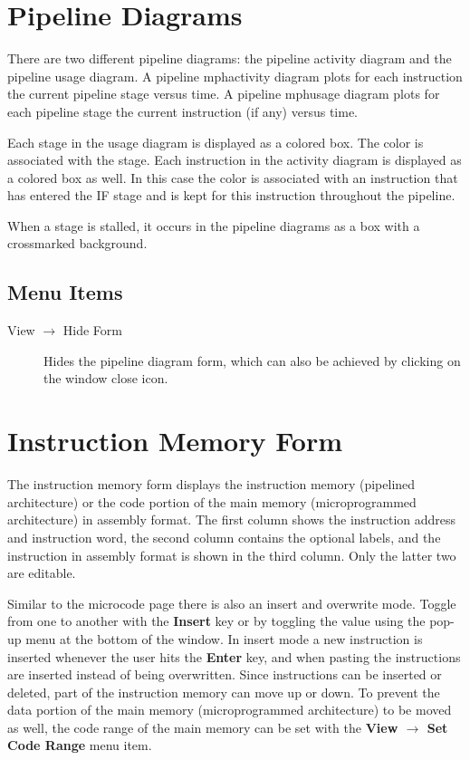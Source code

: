\documentclass{article}
\begin{document}
\section{Pipeline Diagrams}
There are two different pipeline diagrams: the pipeline activity diagram and the pipeline usage diagram. A pipeline mph{activity} diagram plots for each instruction the current pipeline stage versus time. A pipeline mph{usage} diagram plots for each pipeline stage the current instruction (if any) versus time.

Each stage in the usage diagram is displayed as a colored box. The 
color is associated with the stage. Each instruction in the activity 
diagram is displayed as a colored box as well. In this case the color is
 associated with an instruction that has entered the IF stage and is 
kept for this instruction throughout the pipeline. 

When a stage is stalled, it occurs in the pipeline diagrams as a box with a crossmarked background.

\subsection{Menu Items}

\begin{description}
\item[View $\to$ Hide Form] Hides the pipeline diagram form, which can also be achieved by clicking on the window close icon. 
\end{description}

\section{Instruction Memory Form}

The instruction memory form displays the instruction memory (pipelined 
architecture) or the code portion of the main memory (microprogrammed 
architecture) in assembly format. The first column shows the instruction
 address and instruction word, the second column contains the optional 
labels, and the instruction in assembly format is shown in the third 
column. Only the latter two are editable.

Similar to the microcode page there is also an insert and overwrite mode. Toggle from one to another with the \textbf{Insert} key
or by toggling the value using the pop-up menu at the bottom of the window.
In insert mode a new instruction is inserted whenever the user hits the \textbf{Enter}
 key, and when pasting the instructions are inserted instead of being 
overwritten. Since instructions can be inserted or deleted, part of the 
instruction memory can move up or down. To prevent the data portion of 
the main memory (microprogrammed architecture) to be moved as well, the 
code range of the main memory can be set with the \textbf{View $\to$ Set Code Range} menu item. 
\end{document}

